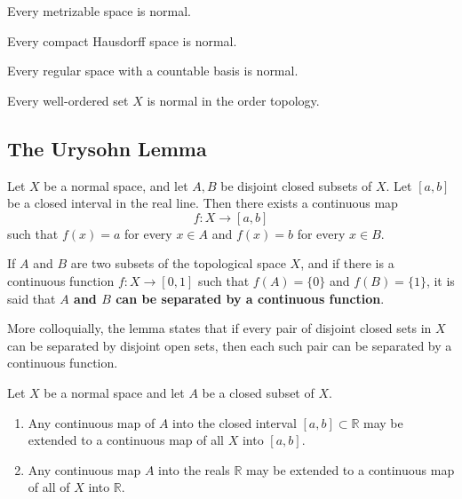     \begin{theorem}
    Every metrizable space is normal. 
    \end{theorem}

    \begin{theorem}
    Every compact Hausdorff space is normal. 
    \end{theorem}

    \begin{theorem}
    Every regular space with a countable basis is normal. 
    \end{theorem}

    \begin{theorem}
    Every well-ordered set $X$ is normal in the order topology. 
    \end{theorem}

  \subsection{The Urysohn Lemma}

    \begin{theorem}
    Let $X$ be a normal space, and let $A, B$ be disjoint closed subsets of $X$. Let $[a,b]$ be a closed interval in the real line. Then there exists a continuous map
    \[f: X \longrightarrow [a,b]\]
    such that $f(x) = a$ for every $x \in A$ and $f(x) = b$ for every $x \in B$. 
    \end{theorem}


    \begin{definition}
    If $A$ and $B$ are two subsets of the topological space $X$, and if there is a continuous function $f: X \longrightarrow [0,1]$ such that $f(A) = \{0\}$ and $f(B) = \{1\}$, it is said that \textbf{$A$ and $B$ can be separated by a continuous function}. 
    \end{definition}

    More colloquially, the lemma states that if every pair of disjoint closed sets in $X$ can be separated by disjoint open sets, then each such pair can be separated by a continuous function. 

    \begin{theorem}
    Let $X$ be a normal space and let $A$ be a closed subset of $X$. 
    \begin{enumerate}
        \item Any continuous map of $A$ into the closed interval $[a,b] \subset \mathbb{R}$ may be extended to a continuous map of all $X$ into $[a,b]$. 
        \item Any continuous map $A$ into the reals $\mathbb{R}$ may be extended to a continuous map of all of $X$ into $\mathbb{R}$. 
    \end{enumerate}
    \end{theorem}

